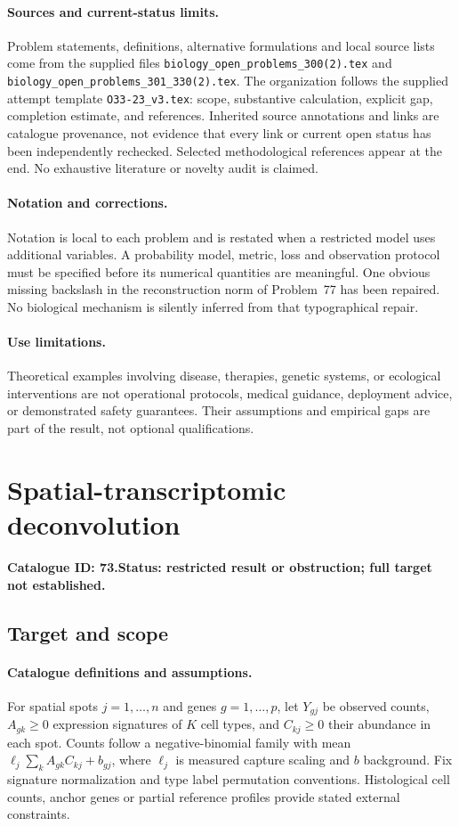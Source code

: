 \documentclass[11pt]{article}
\begin{document}
\paragraph{Sources and current-status limits.}
Problem statements, definitions, alternative formulations and local source lists
come from the supplied files
\texttt{biology\_open\_problems\_300(2).tex} and
\texttt{biology\_open\_problems\_301\_330(2).tex}.
The organization follows the supplied attempt template
\texttt{O33-23\_v3.tex}: scope, substantive calculation, explicit gap,
completion estimate, and references. Inherited source annotations and links are
catalogue provenance, not evidence that every link or current open status has
been independently rechecked. Selected methodological references appear at the
end. No exhaustive literature or novelty audit is claimed.

\paragraph{Notation and corrections.}
Notation is local to each problem and is restated when a restricted model uses
additional variables. A probability model, metric, loss and observation protocol
must be specified before its numerical quantities are meaningful. One obvious
missing backslash in the reconstruction norm of Problem~77 has been repaired.
No biological mechanism is silently inferred from that typographical repair.

\paragraph{Use limitations.}
Theoretical examples involving disease, therapies, genetic systems, or ecological
interventions are not operational protocols, medical guidance, deployment advice,
or demonstrated safety guarantees. Their assumptions and empirical gaps are part
of the result, not optional qualifications.

\setcounter{section}{72}
\section{Spatial-transcriptomic deconvolution}
\label{prob:073}
\noindent\textbf{Catalogue ID: 73.}\quad \textbf{Status: restricted result or obstruction; full target not established.}
\subsection{Target and scope}
\paragraph{Catalogue definitions and assumptions.}
For spatial spots $j=1,\ldots,n$ and genes $g=1,\ldots,p$, let $Y_{gj}$ be observed counts, $A_{gk}\ge0$ expression signatures of $K$ cell types, and $C_{kj}\ge0$ their abundance in each spot. Counts follow a negative-binomial family with mean $\ell_j\sum_k A_{gk}C_{kj}+b_{gj}$, where $\ell_j$ is measured capture scaling and $b$ background. Fix signature normalization and type label permutation conventions. Histological cell counts, anchor genes or partial reference profiles provide stated external constraints.
\end{document}
